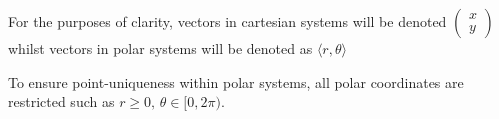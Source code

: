 For the purposes of clarity, vectors in cartesian systems will be denoted $\begin{pmatrix}x\\y\end{pmatrix}$ whilst vectors in polar systems will be denoted as $\langle r,\theta\rangle$

To ensure point-uniqueness within polar systems, all polar coordinates are restricted such as $r\geq0,\,\theta\in[0,2\pi)$.